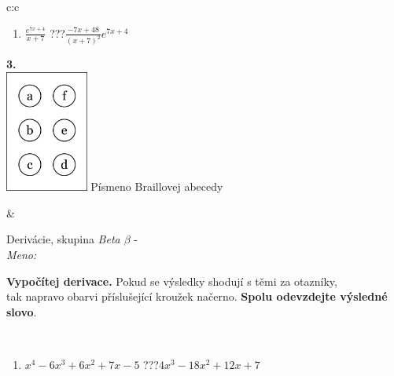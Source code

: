 \documentclass[10pt]{report}
\begin{document}
\begin{tabular}{c:c}
\begin{minipage}[c][104.5mm][t]{0.5\linewidth}
\begin{center}
\begin{minipage}{0.79\linewidth}
\begin{center}
\begin{varwidth}{\linewidth}
\begin{enumerate}
\item $\frac{e^{7x+4}}{x+7}$\quad \dotfill\; ???\;\dotfill \quad $\frac{-7x+48}{(x+7)^2}e^{7x+4}$
\end{enumerate}
\end{varwidth}
\end{center}
\end{minipage}
\begin{minipage}{0.20\linewidth}
\begin{center}
{\Huge\bfseries 3.} \\[2mm]
\includegraphics[height=40mm]{../images/braille.png}
{\small Písmeno Braillovej abecedy}
\end{center}
\end{minipage}
\end{center}
\end{minipage}
&
\begin{minipage}[c][104.5mm][t]{0.5\linewidth}
\begin{center}
\vspace{7mm}
{\huge Derivácie, skupina \textit{Beta $\beta$} -}\\[5mm]
\textit{Meno:}\phantom{xxxxxxxxxxxxxxxxxxxxxxxxxxxxxxxxxxxxxxxxxxxxxxxxxxxxxxxxxxxxxxxxx}\\[5mm]
\begin{minipage}{0.95\linewidth}
\begin{center}
\textbf{Vypočítej derivace.} Pokud se výsledky shodují s těmi za otazníky,\\tak napravo obarvi příslušející kroužek načerno. \textbf{Spolu odevzdejte výsledné slovo}.
\end{center}
\end{minipage}
\\[1mm]
\begin{minipage}{0.79\linewidth}
\begin{center}
\begin{varwidth}{\linewidth}
\begin{enumerate}
\normalsize
\item $x^4-6x^3+6x^2+7x-5$\quad \dotfill\; ???\;\dotfill \quad $4x^3-18x^2+12x+7$

\end{enumerate}
\end{varwidth}
\end{center}
\end{minipage}
\end{center}
\end{minipage}
\end{tabular}
\end{document}
